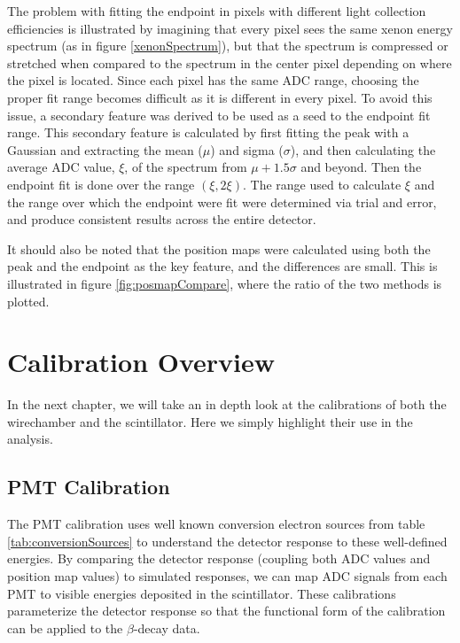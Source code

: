 The problem with fitting the endpoint in pixels with different light collection efficiencies is illustrated by
imagining that every pixel sees the same xenon energy spectrum (as in figure \ref{xenonSpectrum}), but that
the spectrum is compressed or stretched when compared to the spectrum in the center pixel depending on where
the pixel is located. Since each pixel has the same ADC range, choosing the proper fit range becomes difficult
as it is different in every pixel. To avoid this issue, a secondary feature was derived to be used as a
seed to the endpoint fit range. This secondary feature is calculated by first fitting the peak with a Gaussian
and extracting the mean ($\mu$) and sigma ($\sigma$), and then calculating the average ADC value, $\xi$, of the spectrum
from $\mu+1.5\sigma$ and beyond. Then the endpoint fit is done over the range $(\xi,2\xi)$. The range used to
calculate $\xi$ and the range over which the endpoint were fit were determined via trial and error, and produce
consistent results across the entire detector.

It should also be noted that the position maps were calculated using both the peak and the endpoint as the key
feature, and the differences are small. This is illustrated in figure \ref{fig:posmapCompare}, where the
ratio of the two methods is plotted.





\section{Calibration Overview}

In the next chapter, we will take an in depth look at the calibrations of both
the wirechamber and the scintillator. Here we simply highlight their use in the analysis.

\subsection{PMT Calibration}

The PMT calibration uses well known conversion electron sources from table \ref{tab:conversionSources}
to understand the detector response to these well-defined energies. By comparing the detector
response (coupling both ADC values and position map values) to simulated responses,
we can map ADC signals from each PMT to visible energies deposited
in the scintillator. These calibrations parameterize the detector response so that the
functional form of the calibration can be applied to the $\beta$-decay data. 

